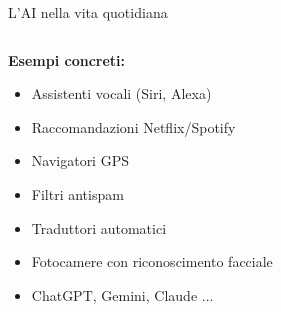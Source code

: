 \documentclass[aspectratio=169,12pt]{beamer}
\begin{document}
\begin{frame}{L'AI nella vita quotidiana}
    \begin{columns}
        \begin{column}{0.5\textwidth}
            \textbf{Esempi concreti:}
            \begin{itemize}
                \item Assistenti vocali (Siri, Alexa)
                \item Raccomandazioni Netflix/Spotify
                \item Navigatori GPS
                \item Filtri antispam
                \item Traduttori automatici
                \item Fotocamere con riconoscimento facciale
                \item ChatGPT, Gemini, Claude ...
            \end{itemize}
        \end{column}
        \begin{column}{0.5\textwidth}
            \begin{center}
            \end{center}
        \end{column}
    \end{columns}
\end{frame}
%
\end{document}
